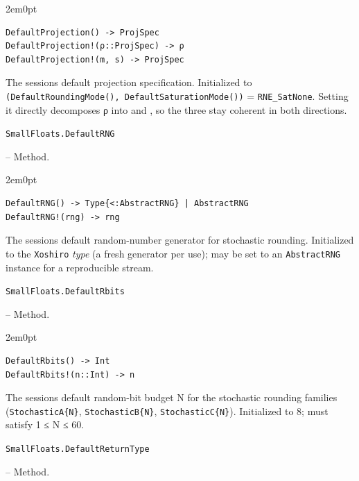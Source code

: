 \begin{adjustwidth}{2em}{0pt}


\begin{verbatim}
DefaultProjection() -> ProjSpec
DefaultProjection!(ρ::ProjSpec) -> ρ
DefaultProjection!(m, s) -> ProjSpec
\end{verbatim}

The session{\textquotesingle}s default projection specification. Initialized to \texttt{(DefaultRoundingMode(), DefaultSaturationMode())} = \texttt{RNE\_SatNone}. Setting it directly decomposes ρ into  and , so the three stay coherent in both directions.



\end{adjustwidth}
\hypertarget{1239855964180895668}{\texttt{SmallFloats.DefaultRNG}}  -- {Method.}

\begin{adjustwidth}{2em}{0pt}


\begin{verbatim}
DefaultRNG() -> Type{<:AbstractRNG} | AbstractRNG
DefaultRNG!(rng) -> rng
\end{verbatim}

The session{\textquotesingle}s default random-number generator for stochastic rounding. Initialized to the \texttt{Xoshiro} \emph{type} (a fresh generator per use); may be set to an \texttt{AbstractRNG} instance for a reproducible stream.



\end{adjustwidth}
\hypertarget{16660646822053217478}{\texttt{SmallFloats.DefaultRbits}}  -- {Method.}

\begin{adjustwidth}{2em}{0pt}


\begin{verbatim}
DefaultRbits() -> Int
DefaultRbits!(n::Int) -> n
\end{verbatim}

The session{\textquotesingle}s default random-bit budget N for the stochastic rounding families (\texttt{StochasticA\{N\}}, \texttt{StochasticB\{N\}}, \texttt{StochasticC\{N\}}). Initialized to 8; must satisfy 1 ≤ N ≤ 60.



\end{adjustwidth}
\hypertarget{10309025597907569675}{\texttt{SmallFloats.DefaultReturnType}}  -- {Method.}

